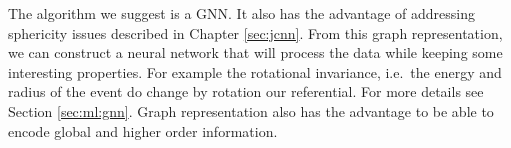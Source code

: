 \documentclass[../main.tex]{subfiles}
\begin{document}
The algorithm we suggest is a GNN. It also has the advantage of addressing sphericity issues described in Chapter \ref{sec:jcnn}.
From this graph representation, we can construct a neural network that will process the data while keeping some interesting properties. For example the rotational invariance, i.e.\ the energy and radius of the event do change by rotation our referential. For more details see Section \ref{sec:ml:gnn}. Graph representation also has the advantage to be able to encode global and higher order information.

%
\end{document}
